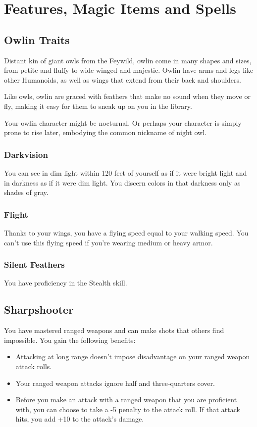 \documentclass[letterpaper,openany,oneside,twocolumn]{book}
\begin{document}
\onecolumn


\rendercharactersheet

\renderbackgroundsheet



\restoregeometry
\twocolumn

\chapter*{Features, Magic Items and Spells}

\section*{Owlin Traits}
Distant kin of giant owls from the Feywild, owlin come in many shapes and sizes, from petite and fluffy to wide-winged and majestic. Owlin have arms and legs like other Humanoids, as well as wings that extend from their back and shoulders.

Like owls, owlin are graced with feathers that make no sound when they move or fly, making it easy for them to sneak up on you in the library.

Your owlin character might be nocturnal. Or perhaps your character is simply prone to rise later, embodying the common nickname of night owl.
\subsection*{Darkvision}
You can see in dim light within 120 feet of yourself as if it were bright light and in darkness as if it were dim light. You discern colors in that darkness only as shades of gray.
\subsection*{Flight}
Thanks to your wings, you have a flying speed equal to your walking speed. You can't use this flying speed if you're wearing medium or heavy armor.
\subsection*{Silent Feathers}
You have proficiency in the Stealth skill.

\section*{Sharpshooter}
You have mastered ranged weapons and can make shots that others find impossible. You gain the following benefits:
\begin{itemize}
	\item Attacking at long range doesn't impose disadvantage on your ranged weapon attack rolls.
	\item Your ranged weapon attacks ignore half and three-quarters cover.
	\item Before you make an attack with a ranged weapon that you are proficient with, you can choose to take a -5 penalty to the attack roll. If that attack hits, you add +10 to the attack's damage.
\end{itemize}
\end{document}
